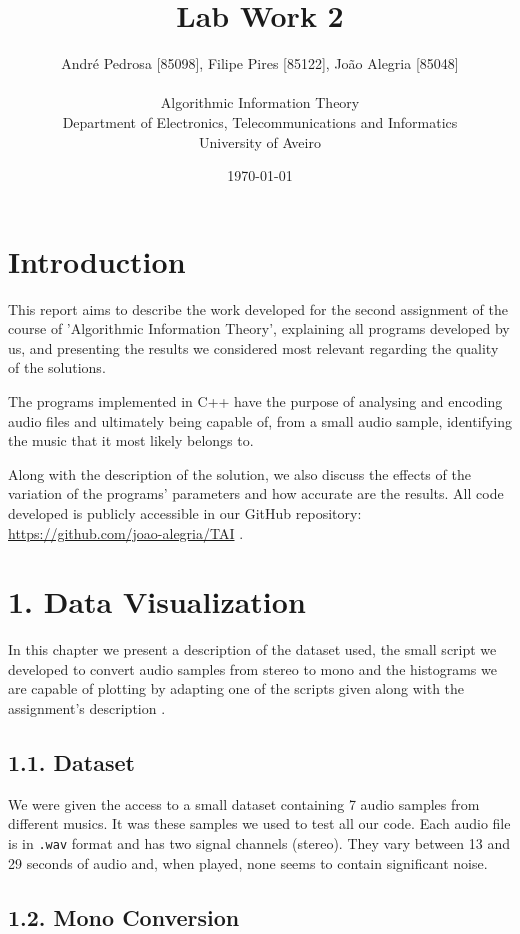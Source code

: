 \documentclass[12pt]{article}
\title{Lab Work 2}
\author
{André Pedrosa [85098], Filipe Pires [85122], João Alegria [85048]\\
\\
Algorithmic Information Theory\\
\normalsize{Department of Electronics, Telecommunications and Informatics}\\
\normalsize{University of Aveiro}\\
}
\date{\today{}}
\begin{document}
 

\baselineskip18pt

\maketitle 

\section*{Introduction}

This report aims to describe the work developed for the second assignment
of the course of 'Algorithmic Information Theory', explaining all programs
developed by us, and presenting the results we considered most relevant 
regarding the quality of the solutions. 

The programs implemented in C++ have the purpose of analysing and encoding
audio files and ultimately being capable of, from a small audio sample, 
identifying the music that it most likely belongs to.

Along with the description of the solution, we also discuss the effects
of the variation of the programs' parameters and how accurate are the results.
All code developed is publicly accessible in our GitHub repository:
\url{https://github.com/joao-alegria/TAI} .
\newpage

\section*{1. Data Visualization}

In this chapter we present a description of the dataset used, the small script 
we developed to convert audio samples from stereo to mono and the histograms
we are capable of plotting by adapting one of the scripts given along with the
assignment's description \cite{trab1}.

\subsection*{1.1. Dataset}

We were given the access to a small dataset containing 7 audio samples from 
different musics. It was these samples we used to test all our code.
Each audio file is in \texttt{.wav} format and has two signal channels (stereo).
They vary between 13 and 29 seconds of audio and, when played, none seems to 
contain significant noise.

\subsection*{1.2. Mono Conversion}
\end{document}
